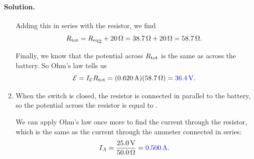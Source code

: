 \documentclass[11pt]{article}
\newcommand{\beq}{\begin{equation*}}
\newcommand{\eeq}{\end{equation*}}
\newenvironment{solution}
{
    \paragraph{Solution.}
    \ignorespaces
}
{
    \bigskip
}
\begin{document}
\begin{solution}
\begin{enumerate}
		\vspace{1.5in}
				
		Adding this in series with the  resistor, we find
		\beq
			\Rtot = {\Req}_2 + \Sohm{20}
			= \Sohm{38.7} + \Sohm{20}
			= \Sohm{58.7}.
		\eeq
		
		\vspace{1.5in}
				
		Finally, we know that the potential across $R_\text{tot}$ is the same as across the battery.  So Ohm's law tells us
		\beq
			\cE = I_\cE \Rtot
			= (\Samp{0.620}) (\Sohm{58.7})
			= {\color{blue} \Svolt{36.4}}.
		\eeq
		
		\vfill
		
		\item When the switch is closed, the  resistor is connected in parallel to the  battery, so the potential across the  resistor is equal to .

		\vspace{1.5in}

		We can apply Ohm's law once more to find the current through the  resistor, which is the same as the current through the ammeter connected in series:
		\beq
			I_A = \frac{\Svolt{25.0}}{\Sohm{50.0}}
			= {\color{blue} \Samp{0.500}}.
		\eeq
	\end{enumerate}
\end{solution}



\clearpage

\newcommand{\Qo}{Q_0}
\newcommand{\Vo}{V_0}
\newcommand{\Ceq}{C_\text{eq}}
\end{document}
